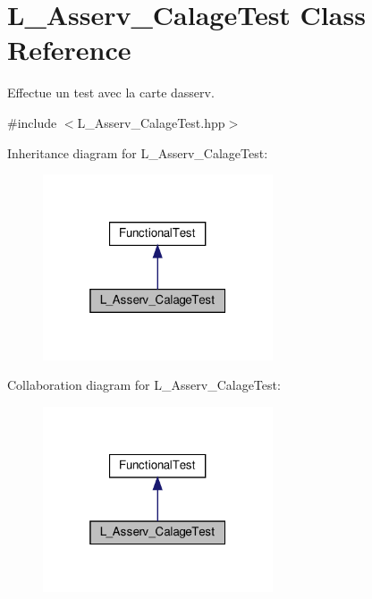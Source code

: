 \hypertarget{classL__Asserv__CalageTest}{}\section{L\+\_\+\+Asserv\+\_\+\+Calage\+Test Class Reference}
\label{classL__Asserv__CalageTest}


Effectue un test avec la carte d\textquotesingle{}asserv.  




{\ttfamily \#include $<$L\+\_\+\+Asserv\+\_\+\+Calage\+Test.\+hpp$>$}



Inheritance diagram for L\+\_\+\+Asserv\+\_\+\+Calage\+Test\+:
\nopagebreak
\begin{figure}[H]
\begin{center}
\leavevmode
\includegraphics[width=193pt]{classL__Asserv__CalageTest__inherit__graph}
\end{center}
\end{figure}


Collaboration diagram for L\+\_\+\+Asserv\+\_\+\+Calage\+Test\+:
\nopagebreak
\begin{figure}[H]
\begin{center}
\leavevmode
\includegraphics[width=193pt]{classL__Asserv__CalageTest__coll__graph}
\end{center}
\end{figure}

